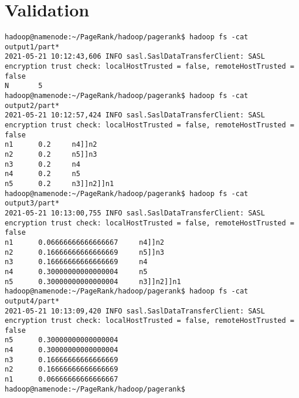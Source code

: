 \documentclass[11pt,a4paper]{article}
\begin{document}
\section{Validation}
\begin{lstlisting}[]
hadoop@namenode:~/PageRank/hadoop/pagerank$ hadoop fs -cat output1/part*
2021-05-21 10:12:43,606 INFO sasl.SaslDataTransferClient: SASL encryption trust check: localHostTrusted = false, remoteHostTrusted = false
N       5
hadoop@namenode:~/PageRank/hadoop/pagerank$ hadoop fs -cat output2/part*
2021-05-21 10:12:57,424 INFO sasl.SaslDataTransferClient: SASL encryption trust check: localHostTrusted = false, remoteHostTrusted = false
n1      0.2     n4]]n2
n2      0.2     n5]]n3
n3      0.2     n4
n4      0.2     n5
n5      0.2     n3]]n2]]n1
hadoop@namenode:~/PageRank/hadoop/pagerank$ hadoop fs -cat output3/part*
2021-05-21 10:13:00,755 INFO sasl.SaslDataTransferClient: SASL encryption trust check: localHostTrusted = false, remoteHostTrusted = false
n1      0.06666666666666667     n4]]n2
n2      0.16666666666666669     n5]]n3
n3      0.16666666666666669     n4
n4      0.30000000000000004     n5
n5      0.30000000000000004     n3]]n2]]n1
hadoop@namenode:~/PageRank/hadoop/pagerank$ hadoop fs -cat output4/part*
2021-05-21 10:13:09,420 INFO sasl.SaslDataTransferClient: SASL encryption trust check: localHostTrusted = false, remoteHostTrusted = false
n5      0.30000000000000004
n4      0.30000000000000004
n3      0.16666666666666669
n2      0.16666666666666669
n1      0.06666666666666667
hadoop@namenode:~/PageRank/hadoop/pagerank$ 
\end{lstlisting}
\end{document}
